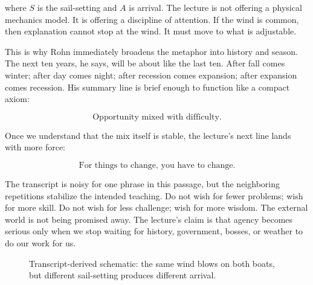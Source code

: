 where \(S\) is the sail-setting and \(A\) is arrival. The lecture is not offering a physical mechanics model. It is offering a discipline of attention. If the wind is common, then explanation cannot stop at the wind. It must move to what is adjustable.

This is why Rohn immediately broadens the metaphor into history and season. The next ten years, he says, will be about like the last ten. After fall comes winter; after day comes night; after recession comes expansion; after expansion comes recession. His summary line is brief enough to function like a compact axiom:

\begin{equation}
\text{Opportunity mixed with difficulty.}
\end{equation}

Once we understand that the mix itself is stable, the lecture's next line lands with more force:

\begin{equation}
\text{For things to change, you have to change.}
\end{equation}

The transcript is noisy for one phrase in this passage, but the neighboring repetitions stabilize the intended teaching. Do not wish for fewer problems; wish for more skill. Do not wish for less challenge; wish for more wisdom. The external world is not being promised away. The lecture's claim is that agency becomes serious only when we stop waiting for history, government, bosses, or weather to do our work for us.

\begin{figure}[h]
\centering
{}
\caption{Transcript-derived schematic: the same wind blows on both boats, but different sail-setting produces different arrival.}
\end{figure}

